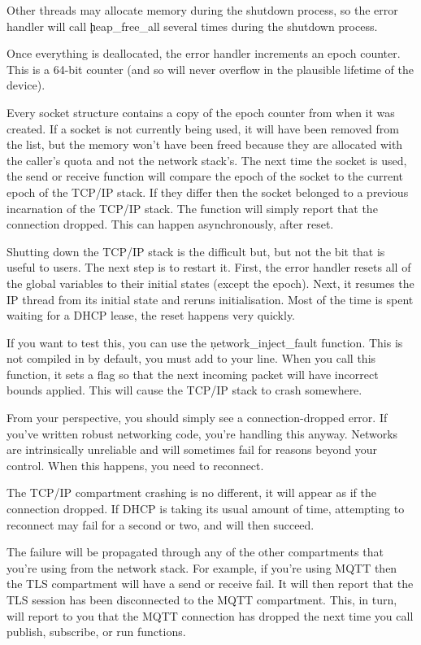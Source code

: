 Other threads may allocate memory during the shutdown process, so the error handler will call \c{heap_free_all} several times during the shutdown process.

Once everything is deallocated, the error handler increments an epoch counter.
This is a 64-bit counter (and so will never overflow in the plausible lifetime of the device).

Every socket structure contains a copy of the epoch counter from when it was created.
If a socket is not currently being used, it will have been removed from the list, but the memory won't have been freed because they are allocated with the caller's quota and not the network stack's.
The next time the socket is used, the send or receive function will compare the epoch of the socket to the current epoch of the TCP/IP stack.
If they differ then the socket belonged to a previous incarnation of the TCP/IP stack.
The function will simply report that the connection dropped.
This can happen asynchronously, after reset.

Shutting down the TCP/IP stack is the difficult but, but not the bit that is useful to users.
The next step is to restart it.
First, the error handler resets all of the global variables to their initial states (except the epoch).
Next, it resumes the IP thread from its initial state and reruns initialisation.
Most of the time is spent waiting for a DHCP lease, the reset happens very quickly.

If you want to test this, you can use the \c{network_inject_fault} function.
This is not compiled in by default, you must add  to your   line.
When you call this function, it sets a flag so that the next incoming packet will have incorrect bounds applied.
This will cause the TCP/IP stack to crash somewhere.


From your perspective, you should simply see a connection-dropped error.
If you've written robust networking code, you're handling this anyway.
Networks are intrinsically unreliable and will sometimes fail for reasons beyond your control.
When this happens, you need to reconnect.

The TCP/IP compartment crashing is no different, it will appear as if the connection dropped.
If DHCP is taking its usual amount of time, attempting to reconnect may fail for a second or two, and will then succeed.

The failure will be propagated through any of the other compartments that you're using from the network stack.
For example, if you're using MQTT then the TLS compartment will have a send or receive fail.
It will then report that the TLS session has been disconnected to the MQTT compartment.
This, in turn, will report to you that the MQTT connection has dropped the next time you call publish, subscribe, or run functions.

